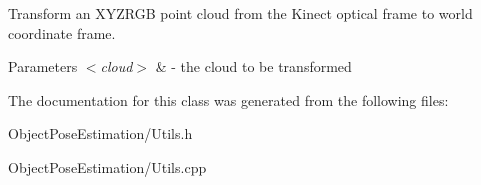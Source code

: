 Transform an X\-Y\-Z\-R\-G\-B point cloud from the Kinect optical frame to world coordinate frame. 


\begin{DoxyParams}{Parameters}
{\em $<$cloud$>$} & -\/ the cloud to be transformed \\
\hline
\end{DoxyParams}


The documentation for this class was generated from the following files\-:\begin{DoxyCompactItemize}
\item 
Object\-Pose\-Estimation/Utils.\-h\item 
Object\-Pose\-Estimation/Utils.\-cpp\end{DoxyCompactItemize}
